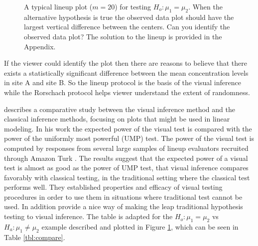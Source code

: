 \documentclass[12]{article}
\begin{document}
\begin{figure}[hbtp]
   \centering
      \caption{A typical lineup plot ($m = 20$) for testing $H_o: \mu_1 =  \mu_2$. 
      When the alternative hypothesis is true the observed data plot should have the largest vertical difference between the centers. Can you identify the observed data plot? The solution to the lineup is provided in the Appendix.}
      \label{lineup}
\end{figure}


If the viewer could identify the plot then there are reasons to believe that there exists a statistically significant difference between the mean concentration levels in site A and site B. So the lineup protocol is the basis of the visual inference while the Rorschach protocol helps viewer understand the extent of randomness. 

\cite{majumder:2011} describes a comparative study between the visual inference method and the classical inference methods, focusing on plots that might be used in linear modeling. In his work the expected power of the visual test is compared with the power of the uniformly most powerful (UMP) test. The power of the visual test is computed by responses from several large samples of lineup evaluators recruited through Amazon Turk \citep{turk}. The results suggest that the expected power of a visual test is almost as good as the power of UMP test, that visual inference compares favorably with classical testing, in the traditional setting where the classical test performs well. They established properties and efficacy of visual testing procedures in order to use them in situations where traditional test cannot be used. In addition \cite{majumder:2011} provide a nice way of making the leap traditional hypothesis testing to visual inference. The table is adapted for the $H_o: \mu_1 =  \mu_2$ vs $H_a: \mu_1 \ne \mu_2$ example described and plotted in Figure \ref{lineup}, which can be seen in Table \ref{tbl:compare}.
\end{document}
